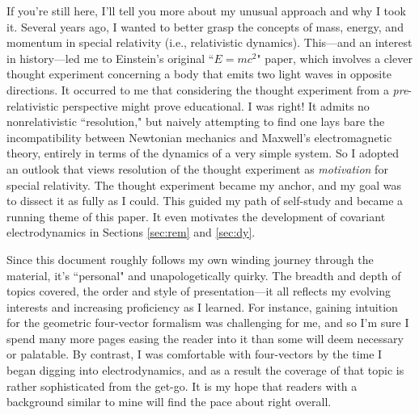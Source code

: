 \documentclass[12pt]{article}
\begin{document}
If you're still here, I'll tell you more about my unusual approach and why I took it. Several years ago, I wanted to better grasp the concepts of mass, energy, and momentum in special relativity (i.e., relativistic dynamics). This---and an interest in history---led me to Einstein's original ``$E = mc^2$" paper, which involves a clever thought experiment concerning a body that emits two light waves in opposite directions. It occurred to me that considering the thought experiment from a \emph{pre}-relativistic perspective might prove educational. I was right! It admits no nonrelativistic ``resolution," but naively attempting to find one lays bare the incompatibility between Newtonian mechanics and Maxwell's electromagnetic theory, entirely in terms of the dynamics of a very simple system. So I adopted an outlook that views resolution of the thought experiment as \emph{motivation} for special relativity. The thought experiment became my anchor, and my goal was to dissect it as fully as I could. This guided my path of self-study and became a running theme of this paper. It even motivates the development of covariant electrodynamics in Sections \ref{sec:rem} and \ref{sec:dy}.

Since this document roughly follows my own winding journey through the material, it's ``personal" and unapologetically quirky. The breadth and depth of topics covered, the order and style of presentation---it all reflects my evolving interests and increasing proficiency as I learned. For instance, gaining intuition for the geometric four-vector formalism was challenging for me, and so I'm sure I spend many more pages easing the reader into it than some will deem necessary or palatable. By contrast, I was comfortable with four-vectors by the time I began digging into electrodynamics, and as a result the coverage of that topic is rather sophisticated from the get-go. It is my hope that readers with a background similar to mine will find the pace about right overall.
\end{document}
